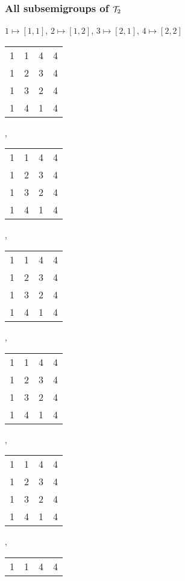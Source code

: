 \documentclass{beamer}
\newcommand{\cT}{{\cal T}}
\begin{document}
\begin{frame}\frametitle{All subsemigroups of $\cT_2$}
$1\mapsto[1,1]$, $2\mapsto[1,2]$, $3\mapsto[2,1]$, $4\mapsto[2,2]$ 
\renewcommand{\arraystretch}{0.3}
\begin{center}
\begin{tabular}{@{}c@{}c@{}c@{}c@{}}
1&1&4&4\\
1&2&3&4\\
1&3&2&4\\
1&4&1&4\\
\end{tabular},\ \ \ 
\begin{tabular}{@{}c@{}c@{}c@{}c@{}}
1&1&\color{lgr}4&4\\
1&2&\color{lgr}3&4\\
\color{lgr}1&\color{lgr}3&\color{lgr}2&\color{lgr}4\\
1&4&\color{lgr}1&4\\
\end{tabular},\ \ \ 
\begin{tabular}{@{}c@{}c@{}c@{}c@{}}
\color{lgr}1&\color{lgr}1&\color{lgr}4&\color{lgr}4\\
\color{lgr}1&2&\color{lgr}3&4\\
\color{lgr}1&\color{lgr}3&\color{lgr}2&\color{lgr}4\\
\color{lgr}1&4&\color{lgr}1&4\\
\end{tabular},\ \ \ 
\begin{tabular}{@{}c@{}c@{}c@{}c@{}}
\color{lgr}1&\color{lgr}1&\color{lgr}4&\color{lgr}4\\
\color{lgr}1&\color{lgr}2&\color{lgr}3&\color{lgr}4\\
\color{lgr}1&\color{lgr}3&\color{lgr}2&\color{lgr}4\\
\color{lgr}1&\color{lgr}4&\color{lgr}1&4\\
\end{tabular},\ \ \ 
\begin{tabular}{@{}c@{}c@{}c@{}c@{}}
1&1&\color{lgr}4&\color{lgr}4\\
1&2&\color{lgr}3&\color{lgr}4\\
\color{lgr}1&\color{lgr}3&\color{lgr}2&\color{lgr}4\\
\color{lgr}1&\color{lgr}4&\color{lgr}1&\color{lgr}4\\
\end{tabular},\ \ \ 
\begin{tabular}{@{}c@{}c@{}c@{}c@{}}
1&\color{lgr}1&\color{lgr}4&4\\

\end{tabular}
\end{center}
\end{frame}
\end{document}
